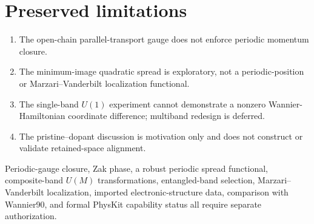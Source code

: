 \documentclass[11pt]{article}
\begin{document}
\section{Preserved limitations}

\begin{enumerate}
 \item The open-chain parallel-transport gauge does not enforce periodic
 momentum closure.
 \item The minimum-image quadratic spread is exploratory, not a
 periodic-position or Marzari--Vanderbilt localization functional.
 \item The single-band $U(1)$ experiment cannot demonstrate a nonzero
 Wannier-Hamiltonian coordinate difference; multiband redesign is deferred.
 \item The pristine--dopant discussion is motivation only and does not construct
 or validate retained-space alignment.
\end{enumerate}

Periodic-gauge closure, Zak phase, a robust periodic spread functional,
composite-band $U(M)$ transformations, entangled-band selection,
Marzari--Vanderbilt localization, imported electronic-structure data, comparison
with Wannier90, and formal PhysKit capability status all require separate
authorization.
\end{document}
